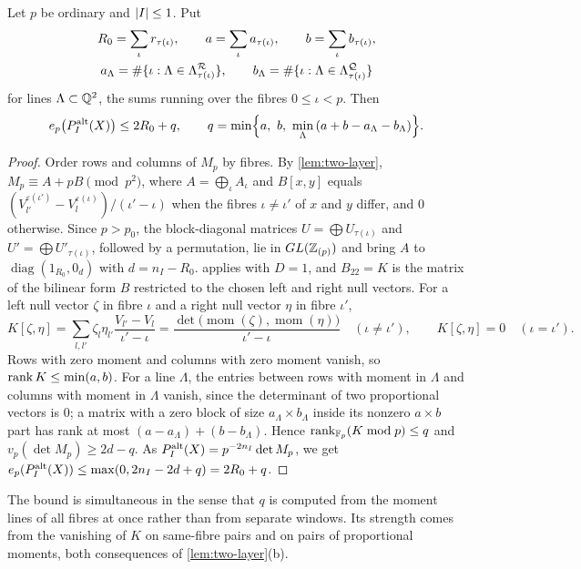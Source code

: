 \begin{proposition}\label{prop:nullspace}
Let $p$ be ordinary and $\lvert I\rvert\le1$. Put
\begin{gather*}
  R_0=\sum_\iota r_{\tau(\iota)},\qquad a=\sum_\iota a_{\tau(\iota)},\qquad
  b=\sum_\iota b_{\tau(\iota)},\\
  a_\Lambda=\#\{\iota:\Lambda\in\Lambda^{\mathcal{R}}_{\tau(\iota)}\},\qquad
  b_\Lambda=\#\{\iota:\Lambda\in\Lambda^{\mathcal{Q}}_{\tau(\iota)}\}
\end{gather*}
for lines $\Lambda\subset\mathbb{Q}^2$, the sums running over the fibres $0\le\iota<p$. Then
\[
  e_p\bigl(P^{\alt}_I(X)\bigr)\le2R_0+q,\qquad
  q=\min\Bigl\{a,\ b,\ \min_\Lambda\,(a+b-a_\Lambda-b_\Lambda)\Bigr\}.
\]
\end{proposition}

\begin{proof}
Order rows and columns of $M_p$ by fibres. By \cref{lem:two-layer},
$M_p\equiv A+pB\pmod{p^2}$, where $A=\bigoplus_\iota A_\iota$ and $B[x,y]$ equals
$(V^{\varepsilon(\iota')}_{l'}-V^{\varepsilon(\iota)}_l)/(\iota'-\iota)$ when the fibres
$\iota\ne\iota'$ of $x$ and $y$ differ, and $0$ otherwise. Since $p>p_0$, the block-diagonal
matrices $U=\bigoplus U_{\tau(\iota)}$ and $U'=\bigoplus U'_{\tau(\iota)}$, followed by a
permutation, lie in $GL(\mathbb{Z}_{(p)})$ and bring $A$ to $\operatorname{diag}(1_{R_0},0_d)$ with
$d=n_I-R_0$.  applies with $D=1$, and $B_{22}=K$ is the matrix of the
bilinear form $B$ restricted to the chosen left and right null vectors. For a left null vector
$\zeta$ in fibre $\iota$ and a right null vector $\eta$ in fibre $\iota'$,
\[
  K[\zeta,\eta]=\sum_{l,l'}\zeta_l\eta_{l'}\frac{V_{l'}-V_l}{\iota'-\iota}
  =\frac{\det\bigl(\operatorname{mom}(\zeta),\operatorname{mom}(\eta)\bigr)}{\iota'-\iota}\quad(\iota\ne\iota'),\qquad
  K[\zeta,\eta]=0\quad(\iota=\iota').
\]
Rows with zero moment and columns with zero moment vanish, so $\operatorname{rank} K\le\min(a,b)$. For a line
$\Lambda$, the entries between rows with moment in $\Lambda$ and columns with moment in
$\Lambda$ vanish, since the determinant of two proportional vectors is $0$; a matrix with a zero
block of size $a_\Lambda\times b_\Lambda$ inside its nonzero $a\times b$ part has rank at most
$(a-a_\Lambda)+(b-b_\Lambda)$. Hence $\operatorname{rank}_{\mathbb{F}_p}(K\bmod p)\le q$ and
$v_p(\det M_p)\ge2d-q$. As $P^{\mathrm{alt}}_I(X)=p^{-2n_I}\det M_p$, we get
$e_p(P^{\mathrm{alt}}_I(X))\le\max(0,2n_I-2d+q)=2R_0+q$.
\end{proof}

The bound is simultaneous in the sense that $q$ is computed from the moment lines of all fibres
at once rather than from separate windows. Its strength comes from the vanishing of $K$ on
same-fibre pairs and on pairs of proportional moments, both consequences of
\cref{lem:two-layer}(b).

